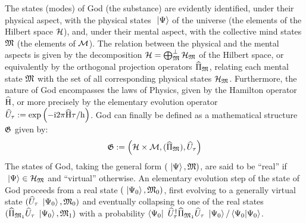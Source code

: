 \documentclass[10pt,a4paper,twoside,openany]{book}
\begin{document}
The states (modes) of God (the substance) are evidently identified, under their physical aspect, with the physical states $\ \left|{\Psi}\right\rangle$ of the universe (the elements of the Hilbert space $\mathcal H$), and, under their mental aspect, with the collective mind states $\mathfrak{M}$ (the elements of $\mathcal M$). The relation between the physical and the mental aspects is given by the decomposition $\mathcal H = \bigoplus_{\mathfrak{M}}^\perp \mathcal H_{\mathfrak{M}}$ of the Hilbert space, or equivalently by the orthogonal projection operators $\widehat{\Pi}_{\mathfrak{M}}$, relating each mental state $\mathfrak{M}$ with the set of all corresponding physical states $\mathcal H_{\mathfrak{M}}$. Furthermore, the nature of God encompasses the laws of Physics, given by the Hamilton operator $\widehat{\mathrm H}$, or more precisely by the elementary evolution operator $\widehat{U}_\tau := \mathrm{exp} \left( {- \mathrm{i} 2 \pi \widehat{\mathrm H} \tau / \mathrm h} \right)$. God can finally be defined as a mathematical structure $\mathfrak{G}$ given by:
\begin{equation*}
\mathfrak{G} := \left( \mathcal H \times \mathcal M, (\widehat{\Pi}_{\mathfrak{M}}), \widehat{U}_\tau \right)
\end{equation*}
The states of God, taking the general form $(\ \left|{\Psi}\right\rangle, \mathfrak{M})$, are said to be ``real'' if $\ \left|{\Psi}\right\rangle \in \mathcal H_{\mathfrak{M}}$ and ``virtual'' otherwise. An elementary evolution step of the state of God proceeds from a real state $(\ \left|{\Psi_0}\right\rangle, \mathfrak{M}_0)$, first evolving to a generally virtual state $(\widehat{U}_\tau \ \left|{\Psi_0}\right\rangle, \mathfrak{M}_0)$ and eventually collapsing to one of the real states $(\widehat{\Pi}_{\mathfrak{M}_1} \widehat{U}_\tau \ \left|{\Psi_0}\right\rangle, \mathfrak{M}_1)$ with a probability $\left\langle{\Psi_0}\right|\  \widehat{U}^{\dagger}_\tau \widehat{\Pi}_{\mathfrak{M}_1} \widehat{U}_\tau \ \left|{\Psi_0}\right\rangle / \left\langle{\Psi_0}|{\Psi_0}\right\rangle$.




\end{document}
